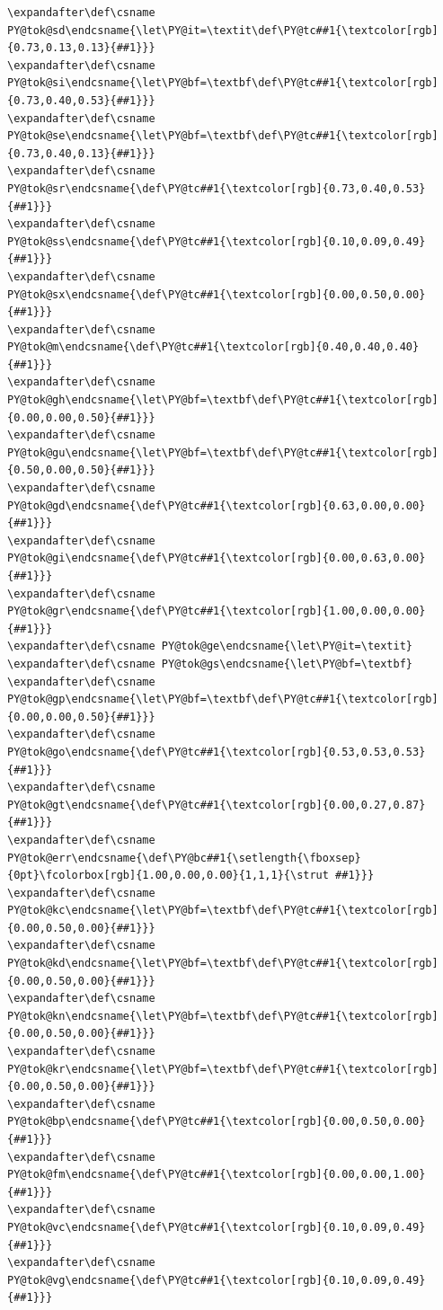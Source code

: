 \documentclass[a4paper]{article}
\begin{document}
\begin{lstlisting}
\expandafter\def\csname PY@tok@sd\endcsname{\let\PY@it=\textit\def\PY@tc##1{\textcolor[rgb]{0.73,0.13,0.13}{##1}}}
\expandafter\def\csname PY@tok@si\endcsname{\let\PY@bf=\textbf\def\PY@tc##1{\textcolor[rgb]{0.73,0.40,0.53}{##1}}}
\expandafter\def\csname PY@tok@se\endcsname{\let\PY@bf=\textbf\def\PY@tc##1{\textcolor[rgb]{0.73,0.40,0.13}{##1}}}
\expandafter\def\csname PY@tok@sr\endcsname{\def\PY@tc##1{\textcolor[rgb]{0.73,0.40,0.53}{##1}}}
\expandafter\def\csname PY@tok@ss\endcsname{\def\PY@tc##1{\textcolor[rgb]{0.10,0.09,0.49}{##1}}}
\expandafter\def\csname PY@tok@sx\endcsname{\def\PY@tc##1{\textcolor[rgb]{0.00,0.50,0.00}{##1}}}
\expandafter\def\csname PY@tok@m\endcsname{\def\PY@tc##1{\textcolor[rgb]{0.40,0.40,0.40}{##1}}}
\expandafter\def\csname PY@tok@gh\endcsname{\let\PY@bf=\textbf\def\PY@tc##1{\textcolor[rgb]{0.00,0.00,0.50}{##1}}}
\expandafter\def\csname PY@tok@gu\endcsname{\let\PY@bf=\textbf\def\PY@tc##1{\textcolor[rgb]{0.50,0.00,0.50}{##1}}}
\expandafter\def\csname PY@tok@gd\endcsname{\def\PY@tc##1{\textcolor[rgb]{0.63,0.00,0.00}{##1}}}
\expandafter\def\csname PY@tok@gi\endcsname{\def\PY@tc##1{\textcolor[rgb]{0.00,0.63,0.00}{##1}}}
\expandafter\def\csname PY@tok@gr\endcsname{\def\PY@tc##1{\textcolor[rgb]{1.00,0.00,0.00}{##1}}}
\expandafter\def\csname PY@tok@ge\endcsname{\let\PY@it=\textit}
\expandafter\def\csname PY@tok@gs\endcsname{\let\PY@bf=\textbf}
\expandafter\def\csname PY@tok@gp\endcsname{\let\PY@bf=\textbf\def\PY@tc##1{\textcolor[rgb]{0.00,0.00,0.50}{##1}}}
\expandafter\def\csname PY@tok@go\endcsname{\def\PY@tc##1{\textcolor[rgb]{0.53,0.53,0.53}{##1}}}
\expandafter\def\csname PY@tok@gt\endcsname{\def\PY@tc##1{\textcolor[rgb]{0.00,0.27,0.87}{##1}}}
\expandafter\def\csname PY@tok@err\endcsname{\def\PY@bc##1{\setlength{\fboxsep}{0pt}\fcolorbox[rgb]{1.00,0.00,0.00}{1,1,1}{\strut ##1}}}
\expandafter\def\csname PY@tok@kc\endcsname{\let\PY@bf=\textbf\def\PY@tc##1{\textcolor[rgb]{0.00,0.50,0.00}{##1}}}
\expandafter\def\csname PY@tok@kd\endcsname{\let\PY@bf=\textbf\def\PY@tc##1{\textcolor[rgb]{0.00,0.50,0.00}{##1}}}
\expandafter\def\csname PY@tok@kn\endcsname{\let\PY@bf=\textbf\def\PY@tc##1{\textcolor[rgb]{0.00,0.50,0.00}{##1}}}
\expandafter\def\csname PY@tok@kr\endcsname{\let\PY@bf=\textbf\def\PY@tc##1{\textcolor[rgb]{0.00,0.50,0.00}{##1}}}
\expandafter\def\csname PY@tok@bp\endcsname{\def\PY@tc##1{\textcolor[rgb]{0.00,0.50,0.00}{##1}}}
\expandafter\def\csname PY@tok@fm\endcsname{\def\PY@tc##1{\textcolor[rgb]{0.00,0.00,1.00}{##1}}}
\expandafter\def\csname PY@tok@vc\endcsname{\def\PY@tc##1{\textcolor[rgb]{0.10,0.09,0.49}{##1}}}
\expandafter\def\csname PY@tok@vg\endcsname{\def\PY@tc##1{\textcolor[rgb]{0.10,0.09,0.49}{##1}}}

\end{lstlisting}
\end{document}
